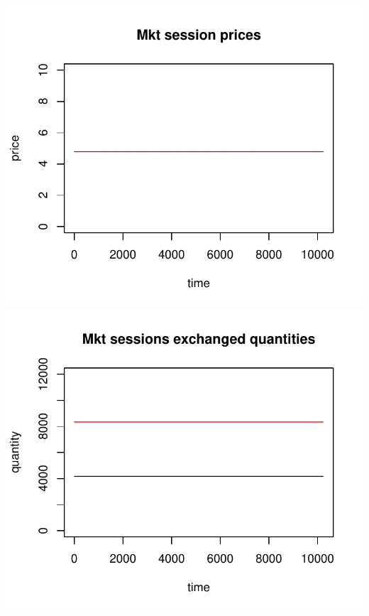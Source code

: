 \documentclass{article}
\begin{document}
\noindent
\vskip-5mm
\hskip-1cm
\includegraphics[scale=0.5]{fig_case01_prices}
\includegraphics[scale=0.5]{fig_case01_quantities}
\end{document}
